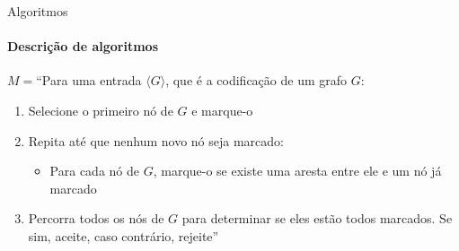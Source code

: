 \documentclass{beamer}
\begin{document}
\begin{frame}{Algoritmos}
	\framesubtitle{Descrição de algoritmos}
	$M = $``Para uma entrada $\langle G\rangle$, que é a codificação de um grafo $G$:
	\begin{enumerate}
		\item Selecione o primeiro nó de $G$ e marque-o
		\item Repita até que nenhum novo nó seja marcado:
		\begin{itemize}
			\item Para cada nó de $G$, marque-o se existe uma aresta entre ele e um nó já marcado
		\end{itemize}
		\item Percorra todos os nós de $G$ para determinar se eles estão todos marcados. Se sim, aceite, caso contrário, rejeite''
	\end{enumerate}
\end{frame}
\end{document}
